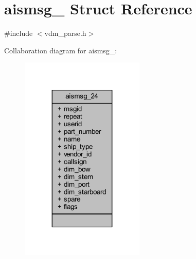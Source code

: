 \hypertarget{structaismsg__24}{}\section{aismsg\+\_ Struct Reference}
\label{structaismsg__24}


{\ttfamily \#include $<$vdm\+\_\+parse.\+h$>$}



Collaboration diagram for aismsg\+\_\+:
\nopagebreak
\begin{figure}[H]
\begin{center}
\leavevmode
\includegraphics[width=167pt]{structaismsg__24__coll__graph}
\end{center}
\end{figure}
